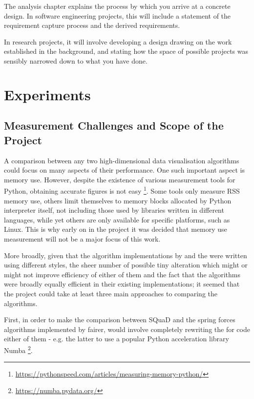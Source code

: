 \documentclass{l4proj}
\begin{document}
The analysis chapter explains the process by which you arrive at a concrete design. In software 
engineering projects, this will include a statement of the requirement capture process and the
derived requirements.

In research projects, it will involve developing a design drawing on
the work established in the background, and stating how the space of possible projects was
sensibly narrowed down to what you have done.

\chapter{Experiments}

\section{Measurement Challenges and Scope of the Project}

A comparison between any two high-dimensional data visualisation algorithms could focus on many aspects of their performance. One such important aspect is memory use. However, despite the existence of various measurement tools for Python, obtaining accurate figures is not easy \footnote{ \url{https://pythonspeed.com/articles/measuring-memory-python/}}. Some tools only measure RSS memory use, others limit themselves to memory blocks allocated by Python interpreter itself, not including those used by libraries written in different languages, while yet others are only available for specific platforms, such as Linux. This is why early on in the project it was decided that memory use measurement will not be a major focus of this work.

More broadly, given that the algorithm implementations by \citet{2019} and the \citet{squad} were written using different styles, the sheer number of possible tiny alteration which might or might not improve efficiency of either of them and the fact that the algorithms were broadly equally efficient in their existing implementations; it seemed that the project could take at least three main approaches to comparing the algorithms.

First, in order to make the comparison between SQuaD and the spring forces algorithms implemented by \citet{2019} fairer, would involve completely rewriting the for code either of them - e.g. the latter to use a popular Python acceleration library Numba \footnote{ \url{https://numba.pydata.org/}}.
\end{document}
